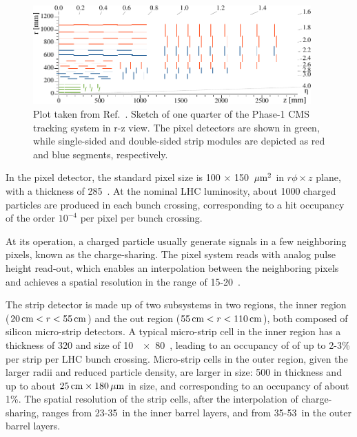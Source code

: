 \begin{figure}[!htb]
    \centering
    \captionsetup{justification=justified}
    \includegraphics[width=0.95\textwidth]{pics/LHC_CMS/Phase1_Tracker.pdf}
    \caption{Plot taken from Ref.~\cite{phase1_tracker}. 
             Sketch of one quarter of the Phase-1 CMS tracking system in r-z view.
             The pixel detectors are shown in green, 
             while single-sided and double-sided strip modules are depicted as red and blue segments, respectively.}
    \label{fig:cms_tracker}
\end{figure}

In the pixel detector, the standard pixel size is 100 $\times$ 150 $\,\mu\text{m}^{2}$ in $r\phi \times z$ plane, with a thickness of 285~\mum.
At the nominal LHC luminosity, about 1000 charged particles are produced in each bunch crossing, 
corresponding to a hit occupancy of the order $10^{-4}$ per pixel per bunch crossing.

At its operation, a charged particle usually generate signals in a few neighboring pixels, known as the charge-sharing.
The pixel system reads with analog pulse height read-out, which enables an interpolation between the neighboring pixels
and achieves a spatial resolution in the range of 15-20~\mum.

The strip detector is made up of two subsystems in two regions, the inner region ($20 \,\text{cm} < r < 55 \,\text{cm}$) 
and the out region ($55 \,\text{cm} < r < 110 \,\text{cm}$), both composed of silicon micro-strip detectors. 
A typical micro-strip cell in the inner region has a thickness of 320 \mum and size of 10~\cm~$\times$~80~\mum,
leading to an occupancy of of up to 2-3\% per strip per LHC bunch crossing.
Micro-strip cells in the outer region, given the larger radii and reduced particle density, are larger in size:
500 \mum in thickness and up to about $25 \,\text{cm} \times 180 \,\mu\text{m}$ in size,
and corresponding to an occupancy of about 1\%.
The spatial resolution of the strip cells, after the interpolation of charge-sharing, 
ranges from 23-35~\mum in the inner barrel layers, and from 35-53~\mum in the outer barrel layers.  

